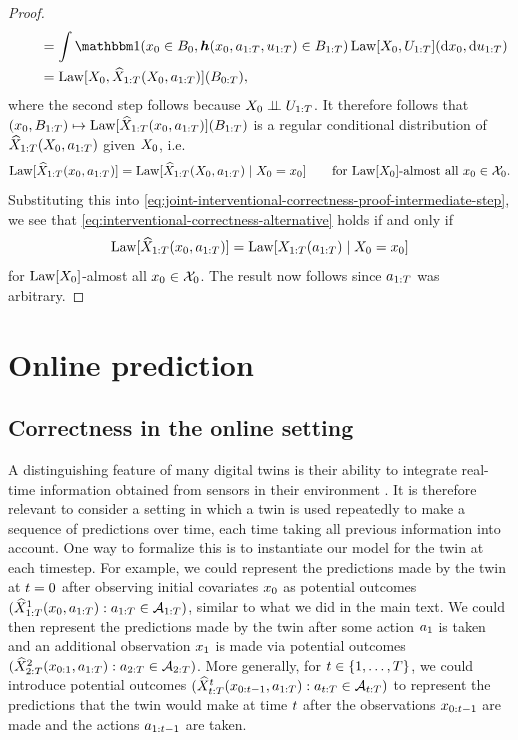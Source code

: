\begin{proof}
\begin{align*}
        &\qquad= \int \ind(\xx_0 \in \B_0, \boldsymbol{\twinfunction}(\xx_0, \ax_{1:\T}, \ux_{1:\T}) \in \B_{1:\T}) \, \Law[\X_0, \twinnoise_{1:\T}](\dee \xx_0, \dee \ux_{1:\T}) \\
        &\qquad= \Law[\X_0, \Xt_{1:\T}(\X_0, \ax_{1:\T})](\B_{0:\T}),
\end{align*}
where the second step follows because $X_0 \perp\!\!\!\perp U_{1:T}$.
It therefore follows that $(x_0, B_{1:T}) \mapsto \mathrm{Law}[\widehat{X}_{1:T}(x_0, a_{1:T})](B_{1:T})$ is a regular conditional distribution of $\widehat{X}_{1:T}(X_0, a_{1:T})$ given $X_0$, i.e.\
\[
    \mathrm{Law}[\widehat{X}_{1:T}(x_0, a_{1:T})] = \mathrm{Law}[\widehat{X}_{1:T}(X_0, a_{1:T}) \mid X_0 = x_0] \qquad \text{for $\mathrm{Law}[X_0]$-almost all $x_0 \in \mathcal{X}_0$.}
\]
Substituting this into \eqref{eq:joint-interventional-correctness-proof-intermediate-step}, we see that \eqref{eq:interventional-correctness-alternative} holds if and only if
\[
    \mathrm{Law}[\widehat{X}_{1:T}(x_0, a_{1:T})] = \mathrm{Law}[X_{1:T}(a_{1:T}) \mid X_0 = x_0]
\]
for $\mathrm{Law}[X_0]$-almost all $x_0 \in \mathcal{X}_0$.
The result now follows since $a_{1:T}$ was arbitrary.
\end{proof}

\section{Online prediction} \label{sec:online-prediction}

\subsection{Correctness in the online setting}

A distinguishing feature of many digital twins is their ability to integrate real-time information obtained from sensors in their environment \citep{barricelli2019survey}.
It is therefore relevant to consider a setting in which a twin is used repeatedly to make a sequence of predictions over time, each time taking all previous information into account.
One way to formalize this is to instantiate our model for the twin at each timestep.
For example, we could represent the predictions made by the twin at $t = 0$ after observing initial covariates $x_0$ as potential outcomes $(\widehat{X}^1_{1:T}(x_0, a_{1:T}) : a_{1:T} \in \mathcal{A}_{1:T})$, similar to what we did in the main text.
We could then represent the predictions made by the twin after some action $a_1$ is taken and an additional observation $x_1$ is made via potential outcomes $(\widehat{X}^2_{2:T}(x_{0:1}, a_{1:T}) : a_{2:T} \in \mathcal{A}_{2:T})$.
More generally, for $t \in \{1, \ldots, T\}$, we could introduce potential outcomes $(\widehat{X}^{t}_{t:T}(x_{0:t-1}, a_{1:T}) : a_{t:T} \in \mathcal{A}_{t:T})$ to represent the predictions that the twin would make at time $t$ after the observations $x_{0:t-1}$ are made and the actions $a_{1:t-1}$ are taken.


